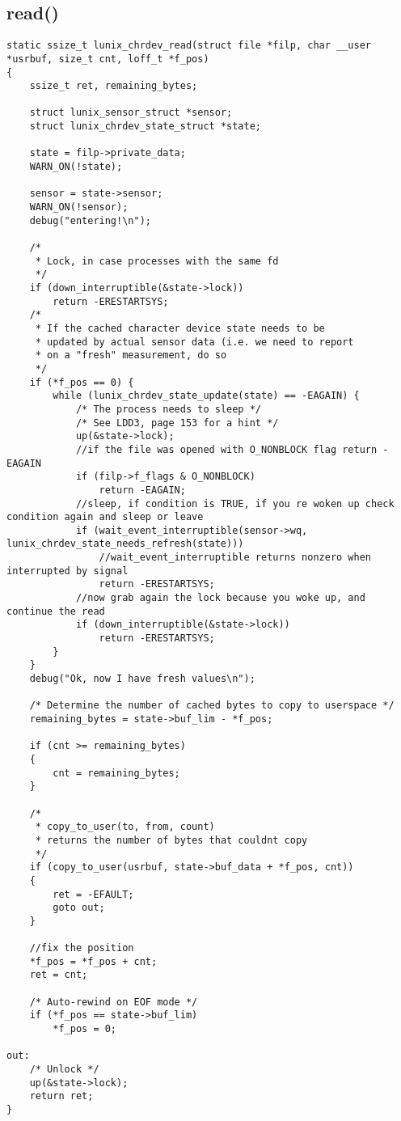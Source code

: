 \documentclass[a4paper]{article}
\begin{document}
\subsection*{read()}
\label{sec:read}
\begin{lstlisting}[style=CStyle]
static ssize_t lunix_chrdev_read(struct file *filp, char __user *usrbuf, size_t cnt, loff_t *f_pos)
{
	ssize_t ret, remaining_bytes;

	struct lunix_sensor_struct *sensor;
	struct lunix_chrdev_state_struct *state;

	state = filp->private_data;
	WARN_ON(!state);

	sensor = state->sensor;
	WARN_ON(!sensor);
    debug("entering!\n");

	/*
     * Lock, in case processes with the same fd
     */
    if (down_interruptible(&state->lock))
        return -ERESTARTSYS;
    /*
	 * If the cached character device state needs to be
	 * updated by actual sensor data (i.e. we need to report
	 * on a "fresh" measurement, do so
	 */
	if (*f_pos == 0) {
		while (lunix_chrdev_state_update(state) == -EAGAIN) {
			/* The process needs to sleep */
			/* See LDD3, page 153 for a hint */
            up(&state->lock);
            //if the file was opened with O_NONBLOCK flag return -EAGAIN
            if (filp->f_flags & O_NONBLOCK)
                return -EAGAIN;
            //sleep, if condition is TRUE, if you re woken up check condition again and sleep or leave
            if (wait_event_interruptible(sensor->wq, lunix_chrdev_state_needs_refresh(state)))
                //wait_event_interruptible returns nonzero when interrupted by signal
                return -ERESTARTSYS;
            //now grab again the lock because you woke up, and continue the read
            if (down_interruptible(&state->lock))
                return -ERESTARTSYS;
		}
	}
    debug("Ok, now I have fresh values\n");

    /* Determine the number of cached bytes to copy to userspace */
    remaining_bytes = state->buf_lim - *f_pos;

    if (cnt >= remaining_bytes)
    {
        cnt = remaining_bytes;
    }

    /*
     * copy_to_user(to, from, count)
     * returns the number of bytes that couldnt copy
     */
    if (copy_to_user(usrbuf, state->buf_data + *f_pos, cnt))
    {
        ret = -EFAULT;
        goto out;
    }

    //fix the position
    *f_pos = *f_pos + cnt;
    ret = cnt;

	/* Auto-rewind on EOF mode */
	if (*f_pos == state->buf_lim)
        *f_pos = 0;

out:
	/* Unlock */
    up(&state->lock);
	return ret;
}
\end{lstlisting}
\end{document}
